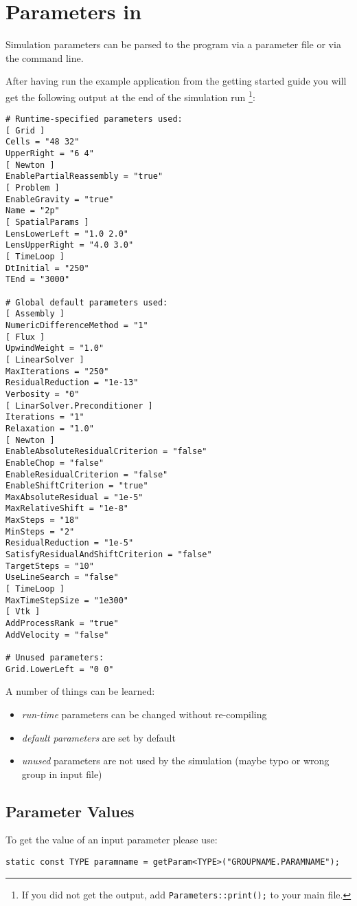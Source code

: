 
\section{Parameters in \Dumux}
\label{sc_parameterfiles}
Simulation parameters can be parsed to the program via a parameter file or via the command line.

After having run the example application from the getting started guide you will
get the following output at the end of the simulation run
\footnote{If you did not get the output, add \texttt{Parameters::print();} to your main file.}:
\begin{lstlisting}[style=Bash]
# Runtime-specified parameters used:
[ Grid ]
Cells = "48 32"
UpperRight = "6 4"
[ Newton ]
EnablePartialReassembly = "true"
[ Problem ]
EnableGravity = "true"
Name = "2p"
[ SpatialParams ]
LensLowerLeft = "1.0 2.0"
LensUpperRight = "4.0 3.0"
[ TimeLoop ]
DtInitial = "250"
TEnd = "3000"

# Global default parameters used:
[ Assembly ]
NumericDifferenceMethod = "1"
[ Flux ]
UpwindWeight = "1.0"
[ LinearSolver ]
MaxIterations = "250"
ResidualReduction = "1e-13"
Verbosity = "0"
[ LinarSolver.Preconditioner ]
Iterations = "1"
Relaxation = "1.0"
[ Newton ]
EnableAbsoluteResidualCriterion = "false"
EnableChop = "false"
EnableResidualCriterion = "false"
EnableShiftCriterion = "true"
MaxAbsoluteResidual = "1e-5"
MaxRelativeShift = "1e-8"
MaxSteps = "18"
MinSteps = "2"
ResidualReduction = "1e-5"
SatisfyResidualAndShiftCriterion = "false"
TargetSteps = "10"
UseLineSearch = "false"
[ TimeLoop ]
MaxTimeStepSize = "1e300"
[ Vtk ]
AddProcessRank = "true"
AddVelocity = "false"

# Unused parameters:
Grid.LowerLeft = "0 0"
\end{lstlisting}

A number of things can be learned:
\begin{itemize}
  \item \emph{run-time} parameters can be changed without re-compiling
  \item \emph{default parameters} are set by default
  \item \emph{unused} parameters are not used by the simulation (maybe typo or wrong group in input file)
\end{itemize}


\subsection{Parameter Values}
To get the value of an input parameter please use:
\begin{lstlisting}[name=propsyscars,style=DumuxCode]
static const TYPE paramname = getParam<TYPE>("GROUPNAME.PARAMNAME");
\end{lstlisting}

